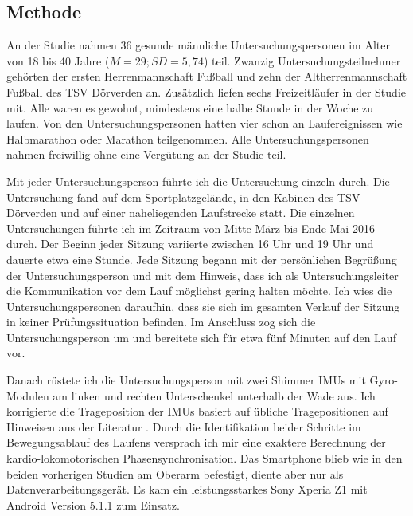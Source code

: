 \subsection{Methode} 

\label{sub:methode_5_3}

An der Studie nahmen 36 gesunde männliche Untersuchungspersonen im Alter von 18 bis 40 Jahre ($M = 29; SD = 5{,}74$) teil. Zwanzig Untersuchungsteilnehmer gehörten der ersten Herrenmannschaft Fußball und zehn der Altherrenmannschaft Fußball des TSV Dörverden an. Zusätzlich liefen sechs Freizeitläufer in der Studie mit. Alle waren es gewohnt, mindestens eine halbe Stunde in der Woche zu laufen. Von den Untersuchungspersonen hatten vier schon an Laufereignissen wie Halbmarathon oder Marathon teilgenommen. Alle Untersuchungspersonen nahmen freiwillig ohne eine Vergütung an der Studie teil. 

Mit jeder Untersuchungsperson führte ich die Untersuchung einzeln durch. Die Untersuchung fand auf dem Sportplatzgelände, in den Kabinen des TSV Dörverden und auf einer naheliegenden Laufstrecke statt. Die einzelnen Untersuchungen führte ich im Zeitraum von Mitte März bis Ende Mai 2016 durch. Der Beginn jeder Sitzung variierte zwischen 16 Uhr und 19 Uhr und dauerte etwa eine Stunde. Jede Sitzung begann mit der persönlichen Begrüßung der Untersuchungsperson und mit dem Hinweis, dass ich als Untersuchungsleiter die Kommunikation vor dem Lauf möglichst gering halten möchte. Ich wies die Untersuchungspersonen daraufhin, dass sie sich im gesamten Verlauf der Sitzung in keiner Prüfungssituation befinden. Im Anschluss zog sich die Untersuchungsperson um und bereitete sich für etwa fünf Minuten auf den Lauf vor. 

Danach rüstete ich die Untersuchungsperson mit zwei Shimmer \acp{IMU} mit Gyro-Modulen am linken und rechten Unterschenkel unterhalb der Wade aus. Ich korrigierte die Trageposition der \acp{IMU} basiert auf übliche Tragepositionen auf Hinweisen aus der Literatur \citep[][]{Hreljac1993}. Durch die Identifikation beider Schritte im Bewegungsablauf des Laufens versprach ich mir eine exaktere Berechnung der kardio-lokomotorischen Phasensynchronisation. Das Smartphone blieb wie in den beiden vorherigen Studien am Oberarm befestigt, diente aber nur als Datenverarbeitungsgerät. Es kam ein leistungsstarkes Sony Xperia Z1 mit Android Version 5.1.1 zum Einsatz.

